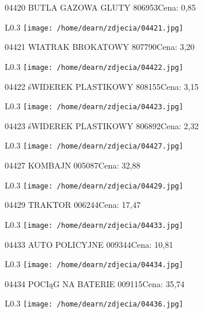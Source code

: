 04420 BUTLA GAZOWA GLUTY                              806953Cena: 0,85\newline
\begin{wrapfigure}{L}{0.3\textwidth}
\texttt{[image: /home/dearn/zdjecia/04421.jpg]}
\end{wrapfigure}
04421 WIATRAK BROKATOWY                              807790Cena: 3,20\newline
\begin{wrapfigure}{L}{0.3\textwidth}
\texttt{[image: /home/dearn/zdjecia/04422.jpg]}
\end{wrapfigure}
04422 śWIDEREK PLASTIKOWY                            808155Cena: 3,15\newline
\begin{wrapfigure}{L}{0.3\textwidth}
\texttt{[image: /home/dearn/zdjecia/04423.jpg]}
\end{wrapfigure}
04423 śWIDEREK PLASTIKOWY                             806892Cena: 2,32\newline
\begin{wrapfigure}{L}{0.3\textwidth}
\texttt{[image: /home/dearn/zdjecia/04427.jpg]}
\end{wrapfigure}
04427 KOMBAJN                                        005087Cena: 32,88\newline
\begin{wrapfigure}{L}{0.3\textwidth}
\texttt{[image: /home/dearn/zdjecia/04429.jpg]}
\end{wrapfigure}
04429 TRAKTOR                                         006244Cena: 17,47\newline
\begin{wrapfigure}{L}{0.3\textwidth}
\texttt{[image: /home/dearn/zdjecia/04433.jpg]}
\end{wrapfigure}
04433 AUTO POLICYJNE                                009344Cena: 10,81\newline
\begin{wrapfigure}{L}{0.3\textwidth}
\texttt{[image: /home/dearn/zdjecia/04434.jpg]}
\end{wrapfigure}
04434 POCIąG NA BATERIE                               009115Cena: 35,74\newline
\begin{wrapfigure}{L}{0.3\textwidth}
\texttt{[image: /home/dearn/zdjecia/04436.jpg]}
\end{wrapfigure}
